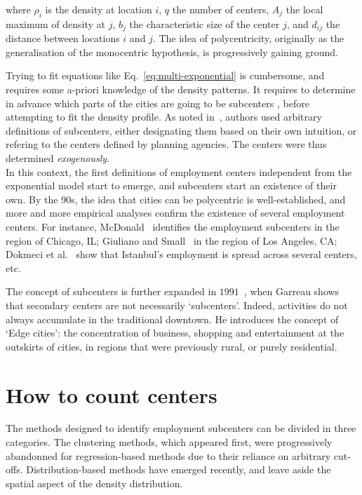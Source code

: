where $\rho_i$ is the density at location $i$, $q$ the number of centers, $A_j$
the local maximum of density at $j$, $b_j$ the characteristic size of the center
$j$, and $d_{ij}$ the distance between locations $i$ and $j$. The idea of
polycentricity, originally as the generalisation of the monocentric hypothesis,
is progressively gaining ground. 

Trying to fit equations like Eq.~\ref{eq:multi-exponential} is cumbersome, and
requires some a-priori knowledge of the density patterns. It requires to
determine in advance which parts of the cities are going to be subcenters
,
before attempting to fit the density profile. As noted in~\cite{Giuliano:1991},
authors used arbitrary definitions of subcenters, either designating them based
on their own intuition, or refering to the centers defined by planning agencies.
The centers were thus determined \emph{exogenously}.\\

In this context, the first definitions of employment centers independent from
the exponential model start to emerge, and subcenters start an existence of
their own. By the $90$s, the idea that cities can be polycentric is
well-established, and more and more empirical analyses confirm the existence of
several employment centers. For instance, McDonald~\cite{McDonald:1987} identifies the
employment subcenters in the region of Chicago, IL; Giuliano and Small~\cite{Giuliano:1991} in the
region of Los Angeles, CA; Dokmeci et al.~\cite{Dokmeci:1994} show that Istanbul's employment
is spread across several centers, etc. 

The concept of subcenters is further expanded in $1991$~\cite{Garreau:1991},
when Garreau shows that secondary centers are not necessarily `subcenters'.
Indeed, activities do not always accumulate in the traditional downtown. He
introduces the concept of `Edge cities': the concentration of business, shopping
and entertainment at the outskirts of cities, in regions that were previously
rural, or purely residential.\\


\section{How to count centers}
\label{sec:how_to_measure_polycentrity}

The methods designed to identify employment subcenters can be divided in three
categories. The clustering methods, which appeared first, were progressively
abandonned for regression-based methods due to their reliance on arbitrary
cut-offs. Distribution-based methods have emerged recently, and leave
aside the spatial aspect of the density distribution.


